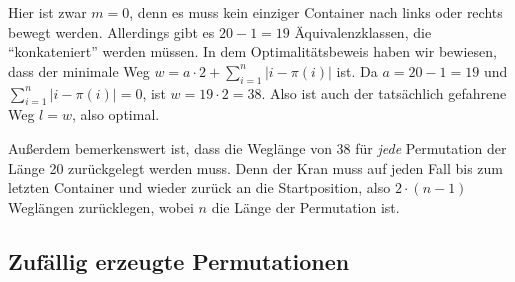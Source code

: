 Hier ist zwar $m = 0$, denn es muss kein einziger Container nach links oder rechts bewegt werden.
Allerdings gibt es $20-1=19$ Äquivalenzklassen, die ``konkateniert'' werden müssen.
In dem Optimalitätsbeweis haben wir bewiesen, dass der minimale Weg $w = a \cdot 2 + \sum_{i = 1}^{n}{\lvert i-\pi(i)\rvert}$ ist.
Da $a=20-1=19$ und $\sum_{i = 1}^{n}{\lvert i-\pi(i)\rvert} = 0$, ist $w = 19 \cdot 2 = 38$. Also ist auch der tatsächlich gefahrene Weg $l = w$, also optimal.

Außerdem bemerkenswert ist, dass die Weglänge von 38 für \emph{jede} Permutation der Länge 20 zurückgelegt werden muss.
Denn der Kran muss auf jeden Fall bis zum letzten Container und wieder zurück an die Startposition, also $2 \cdot (n-1)$ Weglängen zurücklegen, wobei $n$ die Länge der Permutation ist.
\subsection{Zufällig erzeugte Permutationen}
\label{random_perms}
